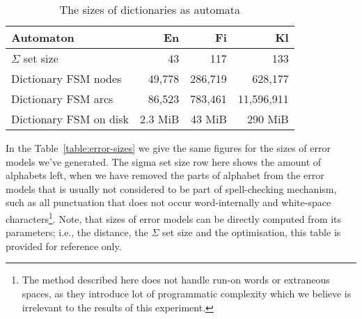 \documentclass[11pt]{article}
\begin{document}
\begin{table}[h]
\begin{center}
\begin{scriptsize}
\begin{tabular}{|l|rrr|}
\hline
\bf Automaton & \bf En & \bf Fi & \bf Kl  \\ 
\hline
$\Sigma$ set size &
 43& 117& 133
\\
Dictionary FSM nodes &
 49,778& 286,719& 628,177
\\
Dictionary FSM arcs &
 86,523& 783,461& 11,596,911
\\
Dictionary FSM on disk & 
2.3 MiB &
43 MiB &
290 MiB
\\
\hline
\end{tabular}
\end{scriptsize}
\end{center}
\caption{\label{table:dictionary-sizes}
The sizes of dictionaries as automata}
\end{table}

In the Table~\ref{table:error-sizes} we give the same figures for the
sizes of error models we've generated. The sigma set size row here shows the
amount of alphabets left, when we have removed the parts of alphabet from the
error models that is usually not considered to be part of spell-checking
mechanism, such as all punctuation that does not occur word-internally and
white-space characters\footnote{The method described here does not handle
run-on words or extraneous spaces, as they introduce lot of programmatic
complexity which we believe is irrelevant to the results of this experiment.}.
Note, that sizes of error models can be directly computed from its parameters;
i.e., the distance, the $\Sigma$ set size and the optimisation, this table
is provided for reference only.
\end{document}

